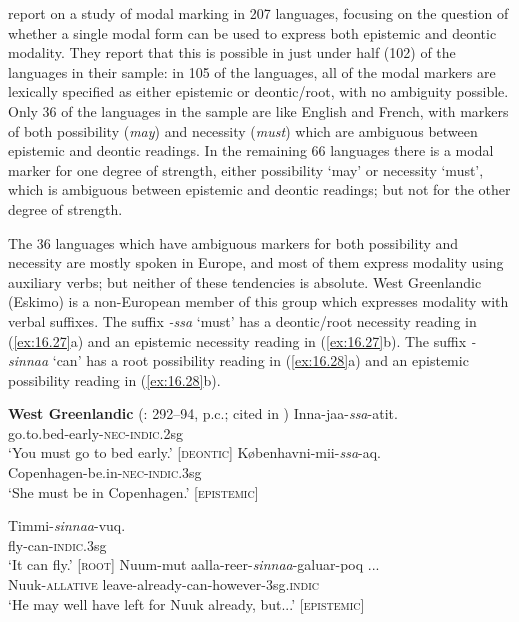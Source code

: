  report on a study of modal marking in 207 languages, focusing on the question of whether a single modal form can be used to express both epistemic and deontic modality. They report that this is possible in just under half (102) of the languages in their sample: in 105 of the languages, all of the modal markers are lexically specified as either epistemic or deontic/root, with no ambiguity possible. Only 36 of the languages in the sample are like English and French, with markers of both possibility (\textit{may}) and necessity (\textit{must}) which are ambiguous between epistemic and deontic readings. In the remaining 66 languages there is a modal marker for one degree of strength, either possibility ‘may’ or necessity ‘must’, which is ambiguous between epistemic and deontic readings; but not for the other degree of strength.


The 36 languages which have ambiguous markers for both possibility and necessity are mostly spoken in Europe, and most of them express modality using auxiliary verbs; but neither of these tendencies is absolute. West Greenlandic (Eskimo) is a non-European member of this group which expresses modality with verbal suffixes. The suffix \textit{-ssa} ‘must’ has a deontic/root necessity reading in (\ref{ex:16.27}a) and an epistemic necessity reading in (\ref{ex:16.27}b). The suffix \textit{-sinnaa} ‘can’ has a root possibility reading in (\ref{ex:16.28}a) and an epistemic possibility reading in (\ref{ex:16.28}b).


\noindent \textbf{West Greenlandic} (\citealt{Fortescue1984}: 292–94, p.c.; cited in \citealt{vanderAuweraAmmann2013}) 
\ea \label{ex:16.27}
\ea  \gll Inna-jaa-\textit{ssa}-atit.\\
go.to.bed-early-\textsc{nec-indic}.2sg\\
\glt ‘You must go to bed early.’  [\textsc{deontic}]
\ex \gll Københavni-mii-\textit{ssa}-aq.\\
Copenhagen-be.in-\textsc{nec-indic}.3sg\\
\glt ‘She must be in Copenhagen.’  [\textsc{epistemic}]
\z \z

\ea \label{ex:16.28} \gll Timmi-\textit{sinnaa}-vuq.\\
fly-can-\textsc{indic}.3sg\\
\glt ‘It can fly.’  [\textsc{root}]
\ex \gll  Nuum-mut  aalla-reer-\textit{sinnaa}-galuar-poq ...\\
Nuuk-\textsc{allative}  leave-already-can-however-3sg.\textsc{indic}\\
\glt ‘He may well have left for Nuuk already, but...’  [\textsc{epistemic}]
\z


